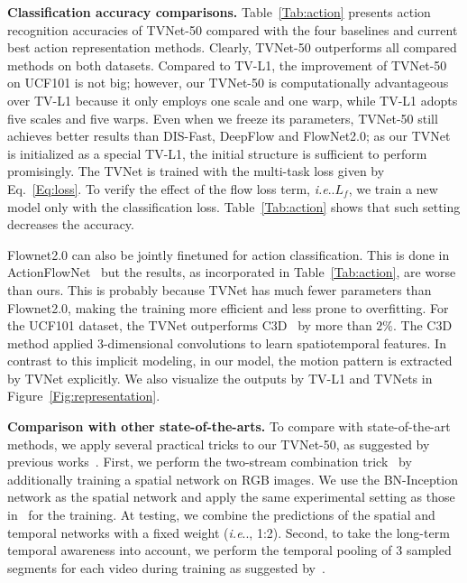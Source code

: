 \documentclass[10pt,twocolumn,letterpaper]{article}
\makeatletter
\DeclareRobustCommand\onedot{\futurelet\@let@token\@onedot}
\def\@onedot{\ifx\@let@token.\else.\null\fi\xspace}
\def\ie{\emph{i.e}\onedot} \def\Ie{\emph{I.e}\onedot}
\makeatother
\begin{document}
\textbf{Classification accuracy comparisons.}
Table~\ref{Tab:action} presents action recognition accuracies of TVNet-50 compared with the four baselines and current best action representation methods.
Clearly, TVNet-50 outperforms all compared methods on both datasets. Compared to TV-L1, the improvement of TVNet-50 on UCF101 is not big; however, our TVNet-50 is computationally advantageous over TV-L1 because it only employs one scale and one warp, while TV-L1 adopts five scales and five warps.  Even when we freeze its parameters, TVNet-50 still achieves better results than DIS-Fast, DeepFlow and FlowNet2.0; as our TVNet is initialized as a special TV-L1, the initial structure is sufficient to perform promisingly.
The TVNet is trained with the multi-task loss given by Eq.~\eqref{Eq:loss}. To verify the effect of the flow loss term, \ie $L_f$,
we train a new model only with the classification loss. Table~\ref{Tab:action} shows that such setting  decreases the accuracy.

Flownet2.0 can also be jointly finetuned for action classification. This is done in ActionFlowNet~\cite{ng2016actionflownet} but the results, as incorporated in Table~\ref{Tab:action}, are worse than ours. This is probably because TVNet has much fewer parameters than Flownet2.0, making the training more efficient and less prone to overfitting.
For the UCF101 dataset, the TVNet outperforms C3D~\cite{tran2015learning} by more than $2\%$. The C3D method applied 3-dimensional convolutions to learn spatiotemporal features. In contrast to this implicit modeling, in our model, the motion pattern is extracted by TVNet explicitly.
We also visualize the outputs by TV-L1 and TVNets in Figure~\ref{Fig:representation}.




\textbf{Comparison with other state-of-the-arts.}
To compare with state-of-the-art methods, we apply several practical tricks to our TVNet-50, as suggested by previous works~\cite{Simonyan_NIPS14,Wang_ECCV16}. First, we perform the two-stream combination trick~\cite{Simonyan_NIPS14} by additionally training a spatial network on RGB images. We use the BN-Inception network as the spatial network and apply the same experimental setting as those in~\cite{Wang_ECCV16} for the training. At testing, we combine the predictions of the spatial and temporal networks with a fixed weight (\ie, 1:2). Second, to take the long-term temporal awareness into account, we perform the temporal pooling of 3 sampled segments for each video during training as suggested by~\cite{Wang_ECCV16}.
\end{document}
